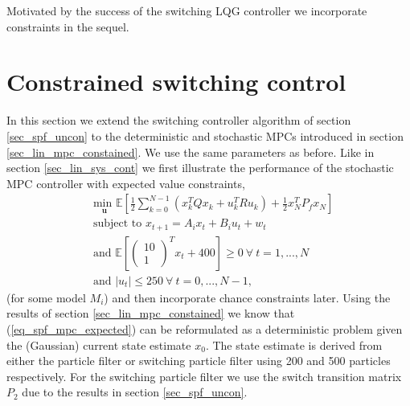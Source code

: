 Motivated by the success of the switching LQG controller we incorporate constraints in the sequel.

\section{Constrained switching control} 
In this section we extend the switching controller algorithm of section \ref{sec_spf_uncon} to the deterministic and stochastic MPCs introduced in section \ref{sec_lin_mpc_constained}. We use the same parameters as before. Like in section \ref{sec_lin_sys_cont} we first illustrate the performance of the stochastic MPC controller with expected value constraints,
\begin{equation}
\begin{aligned}
&\underset{\mathbf{u}}{\text{min }} \mathbb{E}\left[ \frac{1}{2}\sum_{k=0}^{N-1} \left( x_k^TQx_k + u_k^TRu_k \right) + \frac{1}{2}x_N^TP_fx_N \right] \\
& \text{subject to } x_{t+1}=A_ix_t+B_iu_t + w_t\\
& \text{and } \mathbb{E}[\begin{pmatrix}
10 \\ 1
\end{pmatrix}^Tx_t + 400] \geq 0 ~\forall ~t=1,...,N \\
& \text{and } |u_t| \leq 250 ~\forall ~t=0,...,N-1,
\end{aligned}
\label{eq_spf_mpc_expected}
\end{equation} 
(for some model $M_i$) and then incorporate chance constraints later. Using the results of section \ref{sec_lin_mpc_constained} we know that (\ref{eq_spf_mpc_expected}) can be reformulated as a deterministic problem given the (Gaussian) current state estimate $x_0$. The state estimate is derived from either the particle filter or switching particle filter using 200 and 500 particles respectively. For the switching particle filter we use the switch transition matrix $P_2$ due to the results in section \ref{sec_spf_uncon}.

